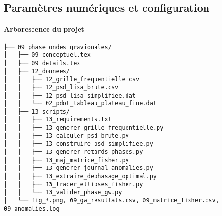 \subsection{Paramètres numériques et configuration}\label{subsec:params-config}

\paragraph{Arborescence du projet}
\begin{verbatim}
├── 09_phase_ondes_gravionales/
│   ├── 09_conceptuel.tex
│   ├── 09_details.tex
│   ├── 12_donnees/
│   │   ├── 12_grille_frequentielle.csv
│   │   ├── 12_psd_lisa_brute.csv
│   │   ├── 12_psd_lisa_simplifiee.dat
│   │   └── 02_pdot_tableau_plateau_fine.dat
│   ├── 13_scripts/
│   │   ├── 13_requirements.txt
│   │   ├── 13_generer_grille_frequentielle.py
│   │   ├── 13_calculer_psd_brute.py
│   │   ├── 13_construire_psd_simplifiee.py
│   │   ├── 13_generer_retards_phases.py
│   │   ├── 13_maj_matrice_fisher.py
│   │   ├── 13_generer_journal_anomalies.py
│   │   ├── 13_extraire_dephasage_optimal.py
│   │   ├── 13_tracer_ellipses_fisher.py
│   │   └── 13_valider_phase_gw.py
│   └── fig_*.png, 09_gw_resultats.csv, 09_matrice_fisher.csv, 09_anomalies.log
\end{verbatim}

